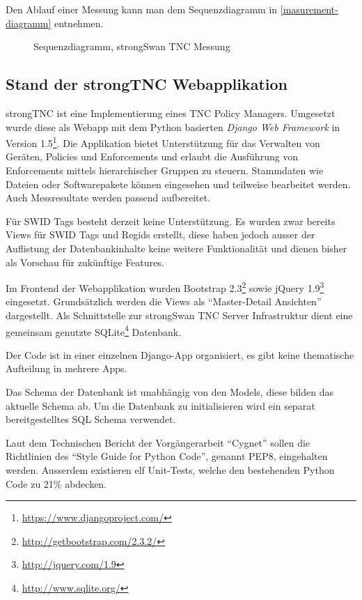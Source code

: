 Den Ablauf einer Messung kann man dem Sequenzdiagramm in
\autoref{masurement-diagramm} entnehmen.

\begin{figure}[H]	
	\centering
	
	\caption{Sequenzdiagramm, strongSwan TNC Messung}
	\label{masurement-diagramm}
\end{figure}


\subsection{Stand der strongTNC Webapplikation} 
\label{analyse:stand}

strongTNC ist eine Implementierung eines TNC Policy Managers. Umgesetzt wurde
diese als Webapp mit dem Python basierten \textit{Django Web Framework} in
Version 1.5\footnote{\url{https://www.djangoproject.com/}}. Die Applikation
bietet Unterstützung für das Verwalten von Geräten, Policies und Enforcements
und erlaubt die Ausführung von Enforcements mittels hierarchischer Gruppen
zu steuern. Stammdaten wie Dateien oder Softwarepakete können eingesehen und
teilweise bearbeitet werden. Auch Messresultate werden passend aufbereitet.

Für SWID Tags besteht derzeit keine Unterstützung. Es wurden zwar bereits Views
für SWID Tags und Regids erstellt, diese haben jedoch ausser der Auflistung der
Datenbankinhalte keine weitere Funktionalität und dienen bisher als Vorschau
für zukünftige Features.

Im Frontend der Webapplikation wurden Bootstrap
2.3\footnote{\url{http://getbootstrap.com/2.3.2/}} sowie jQuery
1.9\footnote{\url{http://jquery.com/1.9}} eingesetzt. Grundsätzlich werden die
Views als \enquote{Master-Detail Ansichten} dargestellt. Als Schnittstelle zur
strongSwan TNC Server Infrastruktur dient eine gemeinsam genutzte
SQLite\footnote{\url{http://www.sqlite.org/}} Datenbank.

Der Code ist in einer einzelnen Django-App organisiert, es gibt keine
thematische Aufteilung in mehrere Apps.

Das Schema der Datenbank ist unabhängig von den Models, diese bilden das
aktuelle Schema ab. Um die Datenbank zu initialisieren wird ein separat
bereitgestelltes SQL Schema verwendet.

Laut dem Technischen Bericht der Vorgängerarbeit
\enquote{Cygnet}\cite{cygnet:2013} sollen die Richtlinien des \enquote{Style
Guide for Python Code}\cite{PEP8:2001}, genannt PEP8, eingehalten werden.
Ausserdem existieren elf Unit-Tests, welche den bestehenden Python Code zu 21\%
abdecken.


